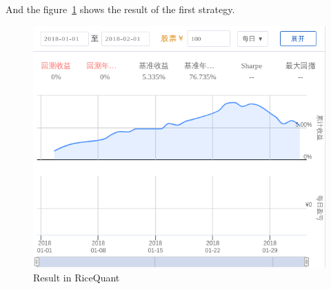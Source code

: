 And the figure~\ref{F:ricequant-getting-started} shows the result of the first strategy.
\begin{figure}
    \centering
    \includegraphics{figures/2019-09-17-qicequant.jpg}
    \caption{Result in RiceQuant}\label{F:ricequant-getting-started}
\end{figure}




